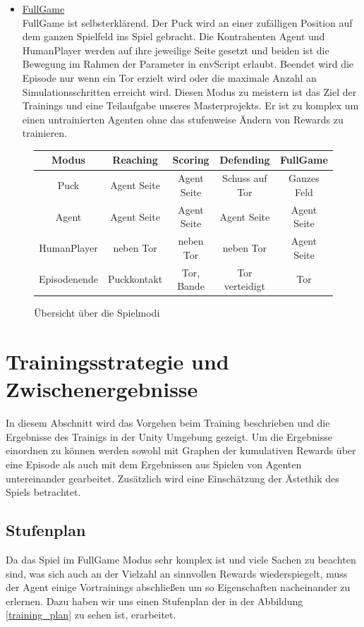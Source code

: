 \begin{itemize}
\item \underline{FullGame} \\
FullGame ist selbsterklärend. Der Puck wird an einer zufälligen Position auf dem ganzen Spielfeld ins Spiel gebracht. Die Kontrahenten Agent und HumanPlayer werden auf ihre jeweilige Seite gesetzt und beiden ist die Bewegung im Rahmen der Parameter in envScript erlaubt. Beendet wird die Episode nur wenn ein Tor erzielt wird oder die maximale Anzahl an Simulationsschritten erreicht wird. Diesen Modus zu meistern ist das Ziel der Trainings und eine Teilaufgabe unseres Masterprojekts. Er ist zu komplex um einen untrainierten Agenten ohne das stufenweise Ändern von Rewards zu trainieren.
\end{itemize}

\begin{figure} [h]
\begin{tabular}[h]{c|c|c|c|c}
 Modus & Reaching & Scoring & Defending & FullGame \\
\hline
Puck  & Agent Seite & Agent Seite & Schuss auf Tor & Ganzes Feld \\
\hline
Agent & Agent Seite  & Agent Seite & Agent Seite & Agent Seite \\
\hline
HumanPlayer & neben Tor  & neben Tor & neben Tor & Agent Seite \\
\hline
Episodenende  & Puckkontakt & Tor, Bande & Tor verteidigt & Tor \\
 
\end{tabular}
\caption{Übersicht über die Spielmodi }
\label{modi_uebersicht}
\end{figure}

\section{Trainingsstrategie und Zwischenergebnisse}
\label{sect:trainings_strats}

In diesem Abschnitt wird das Vorgehen beim Training beschrieben und die Ergebnisse des Trainigs in der Unity Umgebung gezeigt. Um die Ergebnisse einordnen zu können werden sowohl mit Graphen der kumulativen Rewards über eine Episode als auch mit dem Ergebnissen aus Spielen von Agenten untereinander gearbeitet. Zusätzlich wird eine Einschätzung der Ästethik des Spiels betrachtet.\\

\subsection{Stufenplan}
\label{subsect:stufenplan}
Da das Spiel im FullGame Modus sehr komplex ist und viele Sachen zu beachten sind, was sich auch an der Vielzahl an sinnvollen Rewards wiederspiegelt, muss der Agent einige Vortrainings abschließen um so Eigenschaften nacheinander zu erlernen. Dazu haben wir uns einen Stufenplan der in der Abbildung \ref{training_plan} zu sehen ist, erarbeitet.

